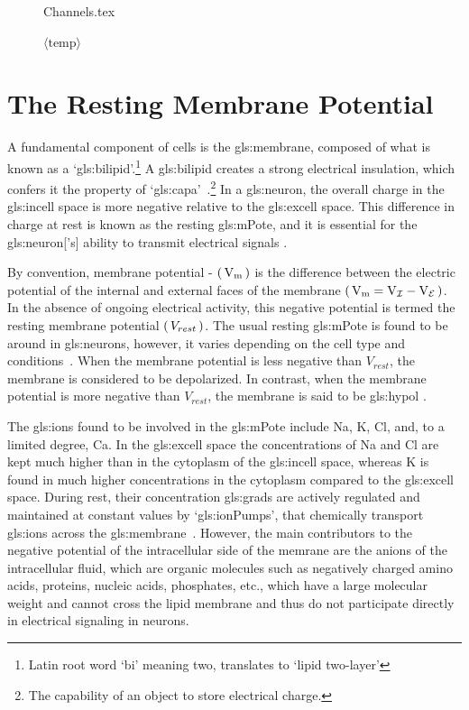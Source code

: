 \documentclass[class={myRUCProject}, crop=false]{standalone}
\begin{document}
\begin{figure}[H]
  \centering
  {Channels.tex}
  \caption{ $\langle \text{temp} \rangle$ }\label{fig:Channels}
\end{figure}

\section{The Resting Membrane Potential} 
A fundamental component of cells is the \gls{gls:membrane}, composed of what is known as a `\gls{gls:bilipid}'.{}\footnote{Latin root word `bi' meaning two, translates to `lipid two-layer'} 
A \gls{gls:bilipid} creates a strong electrical insulation, which confers it the property of `\gls{gls:capa}'~\cite{}.{}\footnote{The capability of an object to store electrical charge.}
In a \gls{gls:neuron}, the overall charge in the \gls{gls:incell} space is more negative relative to the \gls{gls:excell} space. This difference in charge at rest is known as the resting \gls{gls:mPote}, and it is essential for the \gls{gls:neuron}['s] ability to transmit electrical signals \cite{}. 

By convention, membrane potential - \(\br{\unit{\V\membrane}}\) is the difference between the electric potential of the internal and external faces of the membrane \(\br{\unit{\V\membrane}=\unit{\V\incell}-\unit{\V\excell}}\). In the absence of ongoing electrical activity, this negative potential is termed the resting membrane potential \(\left(\,V_{rest}\,\right)\). The usual resting \gls{gls:mPote} is found to be around  in \glspl{gls:neuron}, however, it varies depending on the cell type and conditions~\cite{}. When the membrane potential is less negative than \(V_{rest}\), the membrane is considered to be depolarized. In contrast, when the membrane potential is more negative than \(V_{rest}\), the membrane is said to be \gls{gls:hypol} \cite{Hammond2015ch3}. 

The \glspl{gls:ion} found to be involved in the \gls{gls:mPote} include \gls{Na}, \gls{K}, \gls{Cl}, and, to a limited degree, \gls{Ca}. 
In the \gls{gls:excell} space the concentrations of \gls{Na} and \gls{Cl} are kept much higher than in the cytoplasm of the \gls{gls:incell} space, whereas \gls{K} is found in much higher concentrations in the cytoplasm compared to the \gls{gls:excell} space. During rest, their concentration \glspl{gls:grad} are actively regulated and maintained at constant values by `\glspl{gls:ionPump}', that chemically transport \glspl{gls:ion} across the \gls{gls:membrane}~\cite{}. However, the main contributors to the negative potential of the intracellular side of the memrane are the anions of the intracellular fluid, which are organic molecules such as negatively charged amino acids, proteins, nucleic acids, phosphates, etc., which have a large molecular weight and cannot cross the lipid membrane and thus do not participate directly in electrical signaling in neurons\cite{Hammond2015ch3}. 
\end{document}
